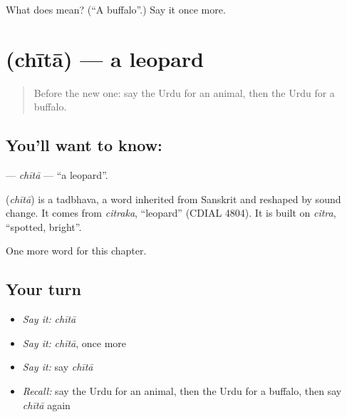 \begin{tcolorbox}[breakable,colback=teal!4,colframe=teal!35!black,title={Before you move on}]
What does  mean? (\textquotedblleft{}A buffalo\textquotedblright{}.) Say it once more.
\end{tcolorbox}
\section[\texorpdfstring{\ur{چیتا} (chītā)}{چیتا (chītā)}]{ (chītā) — a leopard}

\label{lesson:UR-C227-chita}



\begin{quote}
Before the new one: say the Urdu for an animal, then the Urdu for a buffalo.
\end{quote}

\subsection*{You'll want to know: }
\textbf{} — \emph{chītā} — \textquotedblleft{}a leopard\textquotedblright{}.

\begin{cousinweb}
\textbf{} (\emph{chītā}) is a tadbhava, a word inherited from Sanskrit and reshaped by sound change. It comes from \emph{citraka}, \textquotedblleft{}leopard\textquotedblright{} (CDIAL 4804). It is built on \emph{citra}, \textquotedblleft{}spotted, bright\textquotedblright{}.
\end{cousinweb}

\begin{grammarlens}[title={What you've built}]
One more word for this chapter.
\end{grammarlens}

\subsection*{Your turn}
\begin{itemize}
\raggedright
  \item \emph{Say it:} \emph{chītā}
  \item \emph{Say it:} \emph{chītā}, once more
  \item \emph{Say it:} say \emph{chītā}
  \item \emph{Recall:} say the Urdu for an animal, then the Urdu for a buffalo, then say \emph{chītā} again
\end{itemize}

